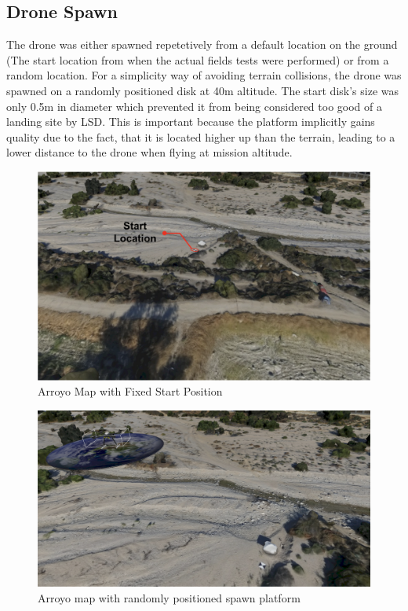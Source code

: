 \subsection{Drone Spawn}
The drone was either spawned repetetively from a default location on the ground (The start location from when the actual fields tests were performed) or from a random location. For a simplicity way of  avoiding terrain collisions, the drone was spawned on a randomly positioned disk at 40m altitude. The start disk's size was only 0.5m in diameter which prevented it from being considered too good of a landing site by LSD. This is important because the platform implicitly gains quality due to the fact, that it is located higher up than the terrain, leading to a lower distance to the drone when flying at mission altitude.
\begin{figure}[h]
    \centering
    \includegraphics[scale=0.42]{images/evaluation/arroyo_with_start.png}
    \caption{Arroyo Map with Fixed Start Position}
    \label{fig:fixed_start}
\end{figure}
\begin{figure}[h]
    \centering
    \includegraphics[scale=0.2]{images/evaluation/arroyo_with_platform.png}
    \caption{Arroyo map with randomly positioned spawn platform}
    \label{fig:random_start}
\end{figure}
\clearpage %

